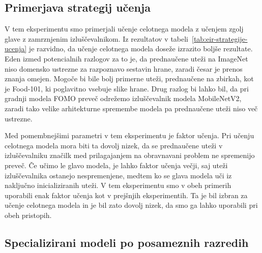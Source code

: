 \documentclass[a4paper,twoside,openright,12pt,slovene]{book}
\begin{document}
        \subsection{Primerjava strategij učenja}
        
            V tem eksperimentu smo primerjali učenje celotnega modela z učenjem
            zgolj glave z zamrznjenim izluščevalnikom. Iz rezultatov v
            tabeli~\ref{tab:eir-strategije-ucenja}
            je razvidno, da učenje celotnega modela doseže izrazito boljše
            rezultate. Eden izmed potencialnih razlogov za to je, da
            prednaučene uteži na ImageNet niso domensko ustrezne za razpoznavo
            sestavin hrane, zaradi česar je prenos znanja omejen. Mogoče bi
            bile bolj primerne uteži, prednaučene na zbirkah, kot je Food-101, ki
            poglavitno vsebuje slike hrane. Drug razlog bi lahko bil, da pri
            gradnji modela FOMO preveč odrežemo izluščevalnik modela
            MobileNetV2, zaradi tako velike arhitekturne spremembe modela pa
            prednaučene uteži niso več ustrezne.
            
            Med pomembnejšimi parametri v tem eksperimentu je faktor učenja. Pri učenju
            celotnega modela mora biti ta dovolj nizek, da se prednaučene uteži v
            izluščevalniku značilk med prilagajanjem na obravnavani problem ne spremenijo
            preveč. Če učimo le glavo modela, je lahko faktor učenja večji, saj uteži
            izluščevalnika ostanejo nespremenjene, medtem ko se glava modela uči iz
            naključno inicializiranih uteži. V tem eksperimentu smo v obeh primerih
            uporabili enak faktor učenja kot v prejšnjih eksperimentih. Ta je bil izbran
            za učenje celotnega modela in je bil zato dovolj nizek, da smo ga lahko
            uporabili pri obeh pristopih.

        \subsection{Specializirani modeli po posameznih razredih}
\end{document}
